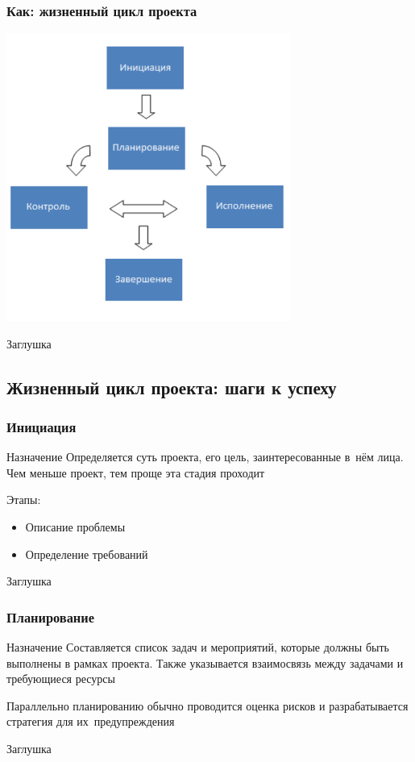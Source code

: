 \documentclass{../industrial-development}
\begin{document}
    \begin{frame} \frametitle{Как: жизненный цикл проекта}
        \centerline{\includegraphics[width=0.7\textwidth]{manageproject.pdf}}
    \end{frame}
    \lecturenotes
    Заглушка

    \subsection{Жизненный цикл проекта: шаги к успеху}
    
    \begin{frame} \frametitle{Инициация}
        \begin{block}{Назначение}
            Определяется суть проекта, его цель, заинтересованные в~нём лица. Чем меньше проект, тем проще эта стадия проходит
        \end{block}
        Этапы:
        \begin{itemize}
            \item Описание проблемы
            \item Определение требований
        \end{itemize}
    \end{frame}
    \lecturenotes
    Заглушка
    
    \begin{frame} \frametitle{Планирование}
        \begin{block}{Назначение}
            Составляется список задач и мероприятий, которые должны быть выполнены в рамках проекта. Также указывается взаимосвязь между задачами и требующиеся ресурсы
        \end{block}
        Параллельно планированию обычно проводится оценка рисков и разрабатывается стратегия для их~предупреждения
    \end{frame}
    \lecturenotes
    Заглушка
\end{document}
